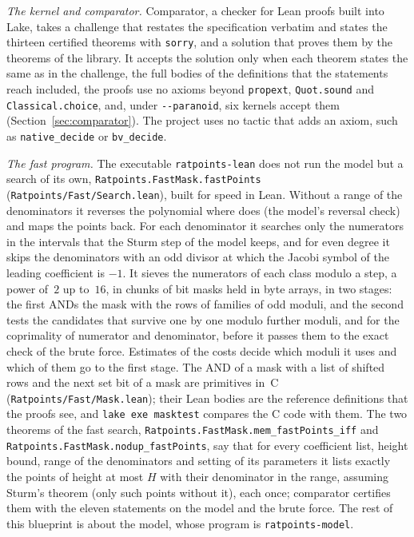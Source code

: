 \emph{The kernel and comparator.} Comparator, a checker for Lean proofs built into Lake, takes a
challenge that restates the specification verbatim and states the thirteen certified theorems with
\verb|sorry|, and a solution that proves them by the theorems of the library. It accepts the
solution only when each theorem states the same as in the challenge, the full bodies of the
definitions that the statements reach included, the proofs use no axioms beyond \verb|propext|,
\verb|Quot.sound| and \verb|Classical.choice|, and, under \verb|--paranoid|, six kernels accept them
(Section~\ref{sec:comparator}). The project uses no tactic that adds an axiom, such as
\verb|native_decide| or \verb|bv_decide|.

\emph{The fast program.} The executable \verb|ratpoints-lean| does not run the model but a search of
its own, \verb|Ratpoints.FastMask.fastPoints| (\verb|Ratpoints/Fast/Search.lean|), built for speed
in Lean. Without a range of the denominators it reverses the polynomial where \ratpoints{} does
(the model's reversal check) and maps the points back. For each denominator it searches only the
numerators in the intervals that the Sturm step of the model keeps, and for even degree it skips the
denominators with an odd divisor at which the Jacobi symbol of the leading coefficient is $-1$. It
sieves the numerators of each class modulo a step, a power of~$2$ up to~$16$, in chunks of bit masks
held in byte arrays, in two stages: the first ANDs the mask with the rows of families of odd moduli,
and the second tests the candidates that survive one by one modulo further moduli, and for the
coprimality of numerator and denominator, before it passes them to the exact check of the brute
force. Estimates of the costs decide which moduli it uses and which of them go to the first stage.
The AND of a mask with a list of shifted rows and the next set bit of a mask are primitives in~C
(\verb|Ratpoints/Fast/Mask.lean|); their Lean bodies are the reference definitions that the proofs
see, and \verb|lake exe masktest| compares the C code with them. The two theorems of the fast
search, \verb|Ratpoints.FastMask.mem_fastPoints_iff| and \verb|Ratpoints.FastMask.nodup_fastPoints|,
say that for every coefficient list, height bound, range of the denominators and setting of its
parameters it lists exactly the points of height at most $H$ with their denominator in the range,
assuming Sturm's theorem (only such points without it), each once; comparator certifies them with
the eleven statements on the model and the brute force. The rest of this blueprint is about the
model, whose program is \verb|ratpoints-model|.

